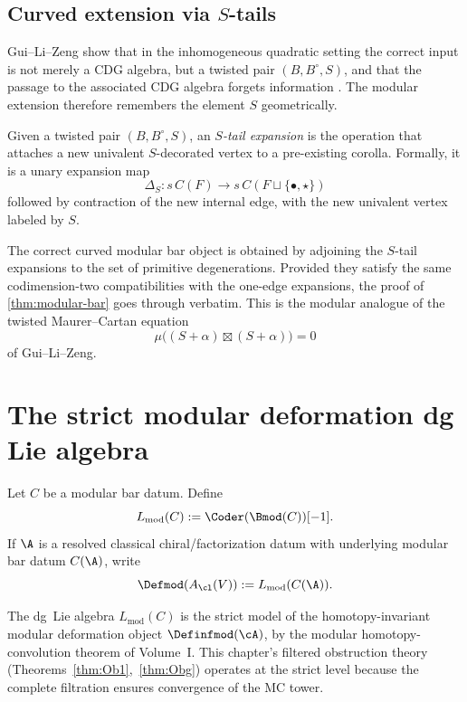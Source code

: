 \subsection{Curved extension via $S$-tails}

Gui--Li--Zeng show that in the inhomogeneous quadratic setting the correct input is not
merely a CDG algebra, but a twisted pair $(B,B^\circ,S)$, and that the passage to the
associated CDG algebra forgets information \cite{GLZ22}. The modular extension
therefore remembers the element $S$ geometrically.

\begin{definition}
Given a twisted pair $(B,B^\circ,S)$, an \emph{$S$-tail expansion} is the operation that
attaches a new univalent $S$-decorated vertex to a pre-existing corolla. Formally, it is
a unary expansion map
\[
\Delta_S:s\,C(F)\to s\,C(F\sqcup \{\bullet,\star\})
\]
followed by contraction of the new internal edge, with the new univalent vertex labeled by $S$.
\end{definition}

\begin{remark}
The correct curved modular bar object is obtained by adjoining the $S$-tail expansions
to the set of primitive degenerations. Provided they satisfy the same codimension-two
compatibilities with the one-edge expansions, the proof of \cref{thm:modular-bar} goes
through verbatim. This is the modular analogue of the twisted Maurer--Cartan equation
\[
\mu\big((S+\alpha)\boxtimes (S+\alpha)\big)=0
\]
of Gui--Li--Zeng.
\end{remark}

\section{The strict modular deformation dg Lie algebra}

\begin{definition}
Let $C$ be a modular bar datum. Define
\[
L_{\mathrm{mod}}(C):=\Coder(\Bmod(C))[-1].
\]
If $\A$ is a resolved classical chiral/factorization datum with underlying modular bar datum
$C(\A)$, write
\[
\Defmod(A_{\cl}(V)):=L_{\mathrm{mod}}(C(\A)).
\]
\end{definition}

\begin{remark}
\label{rem:lmod-strict-model}
The dg~Lie algebra $L_{\mathrm{mod}}(C)$ is the strict model of
the homotopy-invariant modular deformation object
$\Definfmod(\cA)$, by the modular homotopy-convolution theorem of
Volume~I.
This chapter's filtered obstruction theory
(Theorems~\ref{thm:Ob1},~\ref{thm:Obg}) operates at the strict
level because the complete filtration ensures convergence of the
MC tower.
\end{remark}

